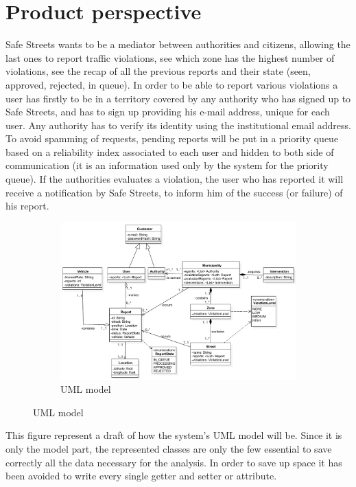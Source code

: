 \documentclass[12pt,a4paper]{report}
\begin{document}
	\section{Product perspective}
		Safe Streets wants to be a mediator between authorities and citizens, allowing the last ones to report traffic violations, see which zone has the highest number of violations, see the recap of all the previous reports and their state
		(seen, approved, rejected, in queue). In order to be able to report various violations a user has firstly to be in a
		territory covered by any authority who has signed up to Safe Streets, and has to sign up providing his e-mail address, unique for each user. Any authority has to verify its identity using the institutional email address.
		To avoid spamming of requests, pending reports will be put in a priority queue based 
		on a reliability index associated to each user and hidden to both side of communication (it is an information used only by 
		the system for the priority queue). If the authorities evaluates a violation, the user who has reported it
		will receive a notification by Safe Streets, to inform him of the success (or failure) of his report. 
		\begin{figure}[H]
			\begin{subfigure}{\textwidth}
				\includegraphics[scale = 0.65, center]{uml}
				\caption{UML model}
				\label{UML model }
			\end{subfigure}
		\end{figure}
		This figure represent a draft of how the system's UML model will be. Since it is only the model part, the represented classes are only the few essential to save correctly all the data necessary for the analysis. In order to save up space it has been avoided to write every single getter and setter or attribute.
\end{document}
